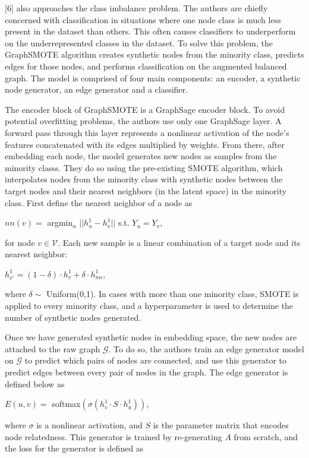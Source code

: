 \documentclass{article}
\begin{document}
[6] also approaches the class imbalance problem. The authors are chiefly concerned with classification in situations where one node class is much less present in the dataset than others. This often causes classifiers to underperform on the underrepresented classes in the dataset. To solve this problem, the GraphSMOTE algorithm creates synthetic nodes from the minority class, predicts edges for those nodes, and performs classification on the augmented balanced graph. The model is comprised of four main components: an encoder, a synthetic node generator, an edge generator and a classifier. 

The encoder block of GraphSMOTE is a GraphSage encoder block. To avoid potential overfitting problems, the authors use only one GraphSage layer. A forward pass through this layer represents a nonlinear activation of the node's features concatenated with its edges multiplied by weights. From there, after embedding each node, the model generates new nodes as samples from the minority classs. They do so using the pre-existing SMOTE algorithm, which interpolates nodes from the minority class with synthetic nodes between the target nodes and their nearest neighbors (in the latent space) in the minority class. First define the nearest neighbor of a node as


\begin{center}
$nn(v) = $ argmin$_u$ $||h^1_u - h^1_v||$ s.t. $Y_u = Y_v$,
\end{center}

for node $v \in \mathcal{V}$. Each new sample is a linear combination of a target node and its nearest neighbor:

\begin{center}
$h_{v'}^1 = (1-\delta) \cdot h^1_v + \delta \cdot h^1_{nn}$,
\end{center}

where $\delta \sim$ Uniform(0,1). In cases with more than one minority class, SMOTE is applied to every minority class, and a hyperparameter is used to determine the number of synthetic nodes generated. 

Once we have generated synthetic nodes in embedding space, the new nodes are attached to the raw graph $\mathcal{G}$. To do so, the authors train an edge generator model on $\mathcal{G}$ to predict which pairs of nodes are connected, and use this generator to predict edges between every pair of nodes in the graph. The edge generator is defined below as

\begin{center}
$E(u,v) =$ softmax$(\sigma(h^1_v \cdot S \cdot h^1_u))$,
\end{center}
where $\sigma$ is a nonlinear activation, and $S$ is the parameter matrix that encodes node relatedness. This generator is trained by re-generating $A$ from scratch, and the loss for the generator is defined as
\end{document}
